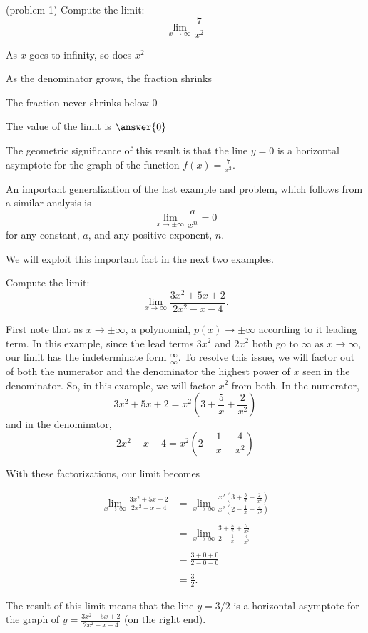 \documentclass[handout]{ximera}
\begin{document}
\begin{problem}(problem 1)
  Compute the limit:
  \[
  \lim_{x \to \infty} \frac{7}{x^2}
  \]
  
    \begin{hint}
      As $x$ goes to infinity, so does $x^2$
    \end{hint}
    \begin{hint}
      As the denominator grows, the fraction shrinks
    \end{hint}
    \begin{hint}
      The fraction never shrinks below 0
    \end{hint}
		The value of the limit is
		 $\answer{0}$
		
		The geometric significance of this result is that the line $y=0$  
is a horizontal asymptote for the graph of the function $f(x) = \frac{7}{x^2}$.
\end{problem}

An important generalization of the last example and problem, which follows from a similar analysis is 
\[\lim_{x \to \pm \infty} \frac{a}{x^n} = 0 \]
for any constant, $a$, and any positive exponent, $n$.

We will exploit this important fact in the next two examples.


\begin{example}[example 2]
Compute the limit:
\[
\lim_{x \to \infty} \frac{3x^2 + 5x + 2}{2x^2 -x- 4}.
\]

First note that as $x\to \pm \infty$, a polynomial, $p(x) \to \pm \infty$ according to it leading term.
In this example, since the lead terms $3x^2$ and $2x^2$ both go to $\infty$ as $x \to \infty$, 
our limit has the indeterminate form
$\frac{\infty}{\infty}$.
To resolve this issue, we will factor out of both the numerator and the denominator 
the highest power of $x$ seen in the denominator.  So, in this example, we will factor $x^2$ from both.
In the numerator, 
\[3x^2 + 5x + 2 = x^2\left(3 + \frac{5}{x} + \frac{2}{x^2}\right)\]
and in the denominator,
\[2x^2 -x -4 = x^2\left(2- \frac{1}{x} - \frac{4}{x^2}\right)\]

With these factorizations, our limit becomes

\begin{align*}
\lim_{x \to \infty} \frac{3x^2 + 5x + 2}{2x^2 -x- 4} &= 
\lim_{x \to \infty} \frac{x^2\left(3 + \frac{5}{x} + \frac{2}{x^2}\right)}{x^2\left(2- \frac{1}{x} - \frac{4}{x^2}\right)} \\ \\
&=\lim_{x \to \infty} \frac{3 + \frac{5}{x} + \frac{2}{x^2}}{2- \frac{1}{x} - \frac{4}{x^2}} \\ \\
&=\frac{3 + 0 + 0}{2- 0 - 0} \\ \\
&= \frac32.
\end{align*}

The result of this limit means that the line $y = 3/2$ is a horizontal asymptote
for the graph of $y = \frac{3x^2 + 5x + 2}{2x^2 -x- 4}$ (on the right end).
\end{example}
\end{document}

